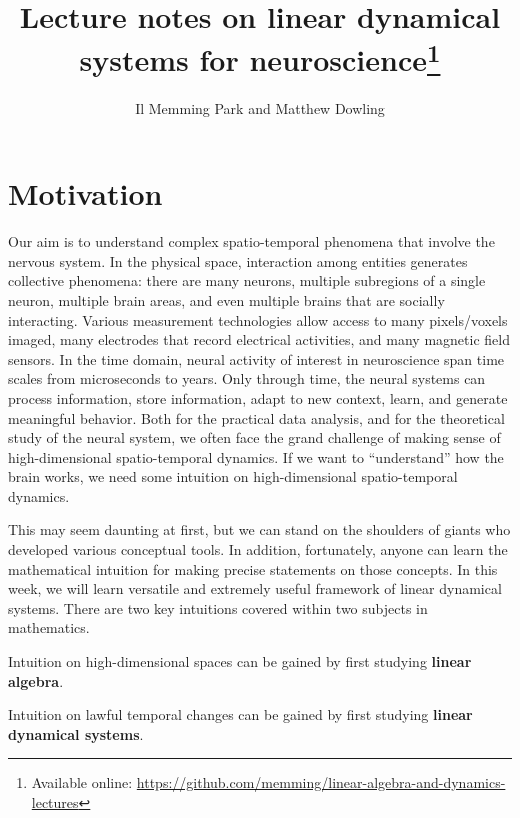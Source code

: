 \documentclass[a4paper,11pt]{exam}
\title{Lecture notes on linear dynamical systems for neuroscience\footnote{Available online: \url{https://github.com/memming/linear-algebra-and-dynamics-lectures}}}
\author{Il Memming Park and Matthew Dowling}
\newcounter{ct}
\begin{document}
\maketitle
\section{Motivation}
Our aim is to understand complex spatio-temporal phenomena that involve the nervous system.
In the physical space, interaction among entities generates collective phenomena: there are many neurons, multiple subregions of a single neuron, multiple brain areas, and even multiple brains that are socially interacting.
Various measurement technologies allow access to many pixels/voxels imaged, many electrodes that record electrical activities, and many magnetic field sensors.
In the time domain, neural activity of interest in neuroscience span time scales from microseconds to years.
Only through time, the neural systems can process information, store information, adapt to new context, learn, and generate meaningful behavior.
Both for the practical data analysis, and for the theoretical study of the neural system, we often face the grand challenge of making sense of high-dimensional spatio-temporal dynamics.
If we want to ``understand'' how the brain works, we need some intuition on high-dimensional spatio-temporal dynamics.

This may seem daunting at first, but we can stand on the shoulders of giants who developed various conceptual tools.
In addition, fortunately, anyone can learn the mathematical intuition for making precise statements on those concepts.
In this week, we will learn versatile and extremely useful framework of linear dynamical systems.
There are two key intuitions covered within two subjects in mathematics.
\begin{tcolorbox}[colback=black!1!,title=Learning Objective 1]
    Intuition on high-dimensional spaces can be gained by first studying \textbf{linear algebra}.
\end{tcolorbox}
\begin{tcolorbox}[colback=black!1!,title=Learning Objective 2]
    Intuition on lawful temporal changes can be gained by first studying \textbf{linear dynamical systems}.
\end{tcolorbox}
\end{document}
